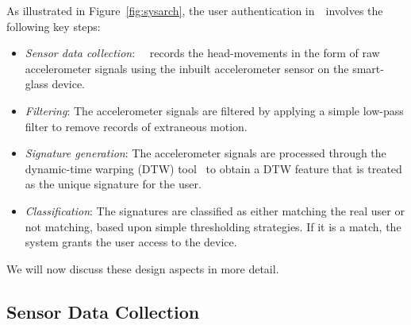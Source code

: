 As illustrated in Figure~\ref{fig:sysarch}, the user authentication in~\systemname~involves the following key steps:
\begin{itemize}
\vspace{-2pt}\item {\em Sensor data collection}: ~\systemname~records the head-movements
in the form of raw accelerometer signals using the inbuilt accelerometer
sensor on the smart-glass device.
\vspace{-2pt}\item {\em Filtering}: The accelerometer signals are filtered by applying
a simple low-pass filter to remove records of extraneous motion.
\vspace{-2pt}\item {\em Signature generation}: The accelerometer signals are
processed through the dynamic-time warping (DTW) tool~\cite{dtw} to obtain a
DTW feature that is treated as the unique signature for the user.
\vspace{-2pt}\item {\em Classification}: The signatures are classified as either matching the real user or not matching, based upon
simple thresholding strategies. If it is a match, the system grants the user access to the device.

\end{itemize}

We will now discuss these design aspects in more detail.

\subsection{Sensor Data Collection}

